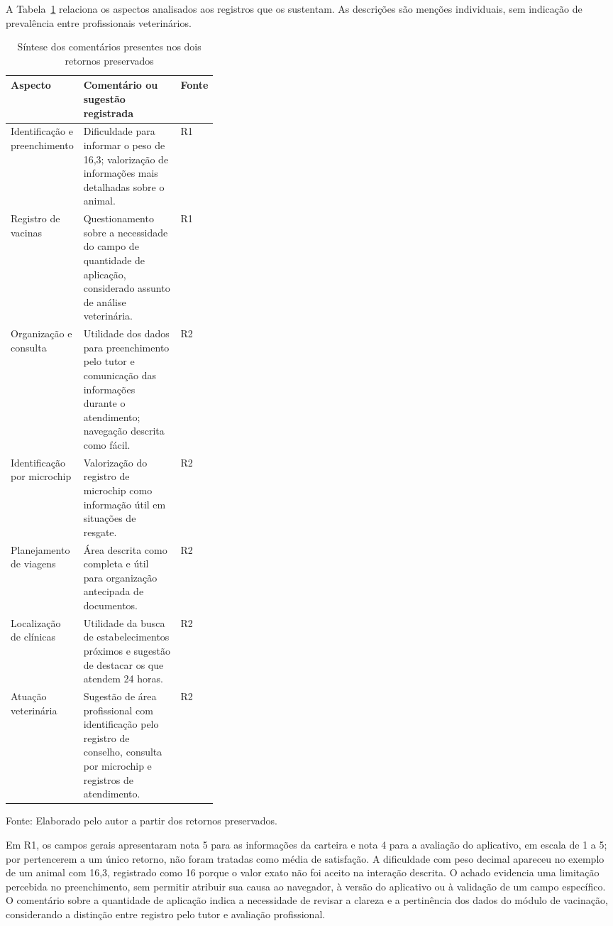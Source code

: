 \documentclass{UNESC}
\begin{document}
A Tabela~\ref{tab:resumo_qualitativo} relaciona os aspectos analisados aos registros que os sustentam. As descrições são menções individuais, sem indicação de prevalência entre profissionais veterinários.

\begin{table}[htbp]
\centering
\caption{Síntese dos comentários presentes nos dois retornos preservados}
\label{tab:resumo_qualitativo}
\small
\setlength{\tabcolsep}{4pt}
\renewcommand{\arraystretch}{1.1}
\begin{tabular}{@{}p{0.24\linewidth} p{} p{0.10\linewidth}@{}}
\hline
\textbf{Aspecto} & \textbf{Comentário ou sugestão registrada} & \textbf{Fonte} \\
\hline
Identificação e preenchimento & Dificuldade para informar o peso de 16,3; valorização de informações mais detalhadas sobre o animal. & R1 \\
Registro de vacinas & Questionamento sobre a necessidade do campo de quantidade de aplicação, considerado assunto de análise veterinária. & R1 \\
Organização e consulta & Utilidade dos dados para preenchimento pelo tutor e comunicação das informações durante o atendimento; navegação descrita como fácil. & R2 \\
Identificação por microchip & Valorização do registro de microchip como informação útil em situações de resgate. & R2 \\
Planejamento de viagens & Área descrita como completa e útil para organização antecipada de documentos. & R2 \\
Localização de clínicas & Utilidade da busca de estabelecimentos próximos e sugestão de destacar os que atendem 24 horas. & R2 \\
Atuação veterinária & Sugestão de área profissional com identificação pelo registro de conselho, consulta por microchip e registros de atendimento. & R2 \\
\hline
\end{tabular}
\par\vspace{2pt}
{\footnotesize\raggedright Fonte: Elaborado pelo autor a partir dos retornos preservados.\par}
\end{table}

Em R1, os campos gerais apresentaram nota 5 para as informações da carteira e nota 4 para a avaliação do aplicativo, em escala de 1 a 5; por pertencerem a um único retorno, não foram tratadas como média de satisfação. A dificuldade com peso decimal apareceu no exemplo de um animal com 16,3, registrado como 16 porque o valor exato não foi aceito na interação descrita. O achado evidencia uma limitação percebida no preenchimento, sem permitir atribuir sua causa ao navegador, à versão do aplicativo ou à validação de um campo específico. O comentário sobre a quantidade de aplicação indica a necessidade de revisar a clareza e a pertinência dos dados do módulo de vacinação, considerando a distinção entre registro pelo tutor e avaliação profissional.
\end{document}
